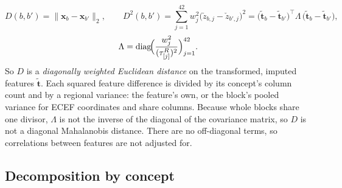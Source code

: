 \documentclass[11pt]{article}
\newcommand{\x}{\mathbf{x}}
\begin{document}
\[
D(b,b')=\|\x_b-\x_{b'}\|_2,\qquad
D^2(b,b')=\sum_{j=1}^{42}w_j^2\bigl(\check z_{b,j}-\check z_{b',j}\bigr)^2
=\bigl(\tilde{\mathbf t}_b-\tilde{\mathbf t}_{b'}\bigr)^{\!\top}\Lambda\,\bigl(\tilde{\mathbf t}_b-\tilde{\mathbf t}_{b'}\bigr),
\]
\[
\Lambda=\operatorname{diag}\!\Bigl(\frac{w_j^2}{(\tau^R_{[j]})^2}\Bigr)_{j=1}^{42}.
\]
So $D$ is a \emph{diagonally weighted Euclidean distance} on the transformed, imputed features
$\tilde{\mathbf t}$. Each squared feature difference is divided by its concept's column count
and by a regional variance: the feature's own, or the block's pooled variance for ECEF
coordinates and share columns. Because whole blocks share one divisor, $\Lambda$ is not the
inverse of the diagonal of the covariance matrix, so $D$ is not a diagonal Mahalanobis
distance. There are no off-diagonal terms, so correlations between features are not adjusted
for.

\subsection{Decomposition by concept}
\end{document}
